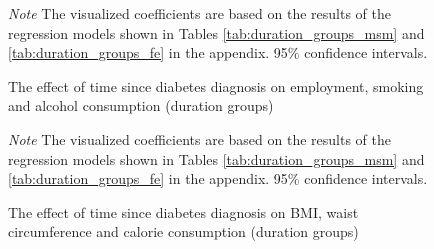 \begin{landscape}
\begin{figure}
\begin{center}
\caption{\label{fig:duration_g_msm_mi} The effect of time since diabetes diagnosis on employment, smoking and alcohol consumption (duration groups)}
\end{center}
\footnotesize\textit{Note} The visualized coefficients are based on the results of the regression models shown in Tables \ref{tab:duration_groups_msm} and \ref{tab:duration_groups_fe} in the appendix. 95\% confidence intervals.

\end{figure}
\begin{figure}
\begin{center}
\caption{\label{fig:duration_g_fe_mi} The effect of time since diabetes diagnosis on BMI, waist circumference and calorie consumption (duration groups)}
\end{center}
\footnotesize\textit{Note} The visualized coefficients are based on the results of the regression models shown in Tables \ref{tab:duration_groups_msm} and \ref{tab:duration_groups_fe} in the appendix. 95\% confidence intervals.

\end{figure}
\end{landscape}


